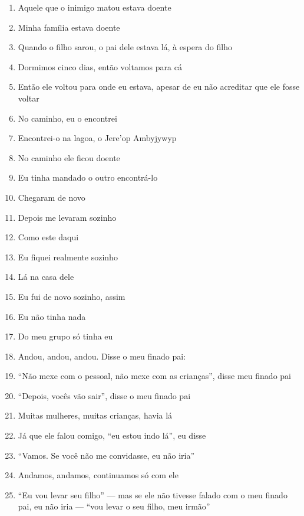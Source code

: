 \begin{enumerate}
 \item Aquele que o inimigo matou estava doente
 \item Minha família estava doente
 \item Quando o filho sarou, o pai dele estava lá, à espera do filho
 \item Dormimos cinco dias, então voltamos para cá
 \item Então ele voltou para onde eu estava, apesar de eu não acreditar que
 ele fosse voltar
 \begin{center}\end{center}
 \item No caminho, eu o encontrei
 \item Encontrei-o na lagoa, o Jere'op Ambyjywyp
 \item No caminho ele ficou doente
 \item Eu tinha mandado o outro encontrá-lo
 \item Chegaram de novo
 \item Depois me levaram sozinho
 \item Como este daqui
 \item Eu fiquei realmente sozinho
 \item Lá na casa dele
 \item Eu fui de novo sozinho, assim
 \item Eu não tinha nada
 \item Do meu grupo só tinha eu
 \begin{center}\end{center}
 \item Andou, andou, andou. Disse o meu finado pai:
 \item ``Não mexe com o pessoal, não mexe com as crianças'', disse meu finado pai
 \item ``Depois, vocês vão sair'', disse o meu finado pai
 \item Muitas mulheres, muitas crianças, havia lá
 \item Já que ele falou comigo, ``eu estou indo lá'', eu disse
 \item ``Vamos. Se você não me convidasse, eu não iria''
 \begin{center}\end{center}
 \item Andamos, andamos, continuamos só com ele
 \item ``Eu vou levar seu filho'' --- mas se ele não tivesse falado com o meu
 finado pai, eu não iria --- ``vou levar o seu filho, meu irmão''

\end{enumerate}
